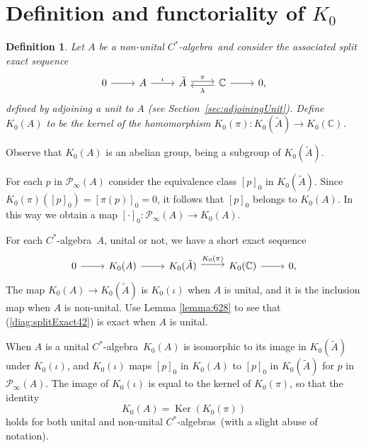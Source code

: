 \documentclass{book}
\newtheorem{definition}{Definition}[section]
\def\cstar{\(C^*\)-algebra}
\def\cstars{\(C^*\)-algebras}
\begin{document}
\section{Definition and functoriality of \texorpdfstring{\(K_0\)}{K0}}
\begin{definition}
  Let \(A\) be a non-unital \cstar\, and consider the associated split exact sequence
  \begin{equation}\label{diag:splitExact41}
    \begin{tikzcd}
      0 \arrow[r]&A\arrow[r,"\iota"] & \tilde{A}\arrow[r, shift left=2pt, "\pi"]
      &\mathbb{C}\arrow[l, shift left=2pt, "\lambda"]\arrow[r]&0,
    \end{tikzcd}
  \end{equation}
  defined by adjoining a unit to \(A\) (see Section~\ref{sec:adjoiningUnit}). 
  Define \(K_0(A)\) to be the kernel of the homomorphism \(K_0(\pi):K_0(\tilde{A})\to K_0(\mathbb{C})\).
\end{definition}
Observe that \(K_0(A)\) is an abelian group, being a subgroup of \(K_0(\tilde{A})\).\par
For each \(p\) in \(\mathcal{P}_\infty(A)\) consider the equivalence class \({[p]}_0\) in \(K_0(\tilde{A})\).
Since \(K_0(\pi)({[p]}_0)={[\pi(p)]}_0=0\), it follows that \({[p]}_0\) belongs to \(K_0(A)\). In this way we obtain a map \({[\cdot]}_0:\mathcal{P}_\infty(A)\to K_0(A)\).\par
For each \cstar\ \(A\), unital or not, we have a short exact sequence
\begin{equation}\label{diag:splitExact42}
  \begin{tikzcd}
    0 \arrow[r]&K_0(A)\arrow[r] & K_0(\tilde{A})\arrow[r, shift left=2pt, "K_0(\pi)"]
    &K_0(\mathbb{C})\arrow[r]&0,
  \end{tikzcd}
\end{equation}
The map \(K_0(A)\to K_0(\tilde{A})\) is \(K_0(\iota)\) when \(A\) is unital, and it is the inclusion map when \(A\) is non-unital.
Use Lemma \ref{lemma:628} to see that (\ref{diag:splitExact42}) is exact when \(A\) is unital.\par
When \(A\) is a unital \cstar\, \(K_0(A)\) is isomorphic to its image in \(K_0(\tilde{A})\)
under \(K_0(\iota)\), and \(K_0(\iota)\) maps \({[p]}_0\) in \(K_0(A)\) to \({[p]}_0\) in \(K_0(\tilde{A})\) for \(p\) in \(\mathcal{P}_\infty(A)\).
The image of \(K_0(\iota)\) is equal to the kernel of \(K_0(\pi)\), so that the identity
\[
  K_0(A)=\operatorname{Ker}(K_0(\pi))
\]
holds for both unital and non-unital \cstars\ (with a slight abuse of notation).\par
\end{document}

